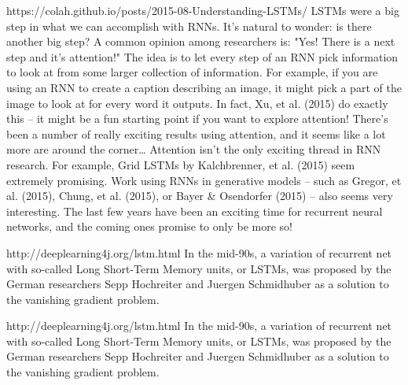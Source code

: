 {https://colah.github.io/posts/2015-08-Understanding-LSTMs/
LSTMs were a big step in what we can accomplish with RNNs. It’s natural to wonder: is there another big step? A common opinion among researchers is: "Yes! There is a next step and it’s attention!" The idea is to let every step of an RNN pick information to look at from some larger collection of information. For example, if you are using an RNN to create a caption describing an image, it might pick a part of the image to look at for every word it outputs. In fact, Xu, et al. (2015) do exactly this – it might be a fun starting point if you want to explore attention! There’s been a number of really exciting results using attention, and it seems like a lot more are around the corner…
Attention isn’t the only exciting thread in RNN research. For example, Grid LSTMs by Kalchbrenner, et al. (2015) seem extremely promising. Work using RNNs in generative models – such as Gregor, et al. (2015), Chung, et al. (2015), or Bayer \& Osendorfer (2015) – also seems very interesting. The last few years have been an exciting time for recurrent neural networks, and the coming ones promise to only be more so!

http://deeplearning4j.org/lstm.html
In the mid-90s, a variation of recurrent net with so-called Long Short-Term Memory units, or LSTMs, was proposed by the German researchers Sepp Hochreiter and Juergen Schmidhuber as a solution to the vanishing gradient problem.

http://deeplearning4j.org/lstm.html
In the mid-90s, a variation of recurrent net with so-called Long Short-Term Memory units, or LSTMs, was proposed by the German researchers Sepp Hochreiter and Juergen Schmidhuber as a solution to the vanishing gradient problem.
} %